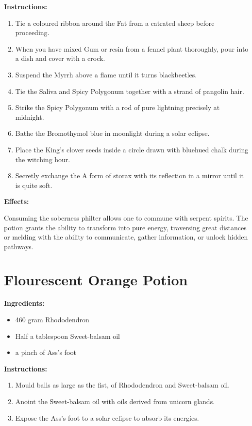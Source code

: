 \documentclass{article}
\begin{document}
\textbf{Instructions:}

\begin{enumerate}
  \item Tie a coloured ribbon around the Fat from a catrated sheep before proceeding.
  \item When you have mixed Gum or resin from a fennel plant thoroughly, pour into a dish and cover with a crock.
  \item Suspend the Myrrh above a flame until it turns blackbeetles.
  \item Tie the Saliva and Spicy Polygonum together with a strand of pangolin hair.
  \item Strike the Spicy Polygonum with a rod of pure lightning precisely at midnight.
  \item Bathe the Bromothymol blue in moonlight during a solar eclipse.
  \item Place the King's clover seeds inside a circle drawn with bluehued chalk during the witching hour.
  \item Secretly exchange the A form of storax with its reflection in a mirror until it is quite soft.
\end{enumerate}

\textbf{Effects:}

Consuming the soberness philter allows one to commune with serpent spirits. The potion grants the ability to transform into pure energy, traversing great distances or melding with the ability to communicate, gather information, or unlock hidden pathways.

\newpage
\section*{Flourescent Orange Potion}

\textbf{Ingredients:}

\begin{itemize}
  \item 460 gram Rhododendron
  \item Half a tablespoon Sweet-balsam oil
  \item a pinch of Ass's foot
\end{itemize}

\textbf{Instructions:}

\begin{enumerate}
  \item Mould balls as large as the fist, of Rhododendron and Sweet-balsam oil.
  \item Anoint the Sweet-balsam oil with oils derived from unicorn glands.
  \item Expose the Ass's foot to a solar eclipse to absorb its energies.
\end{enumerate}
\end{document}
